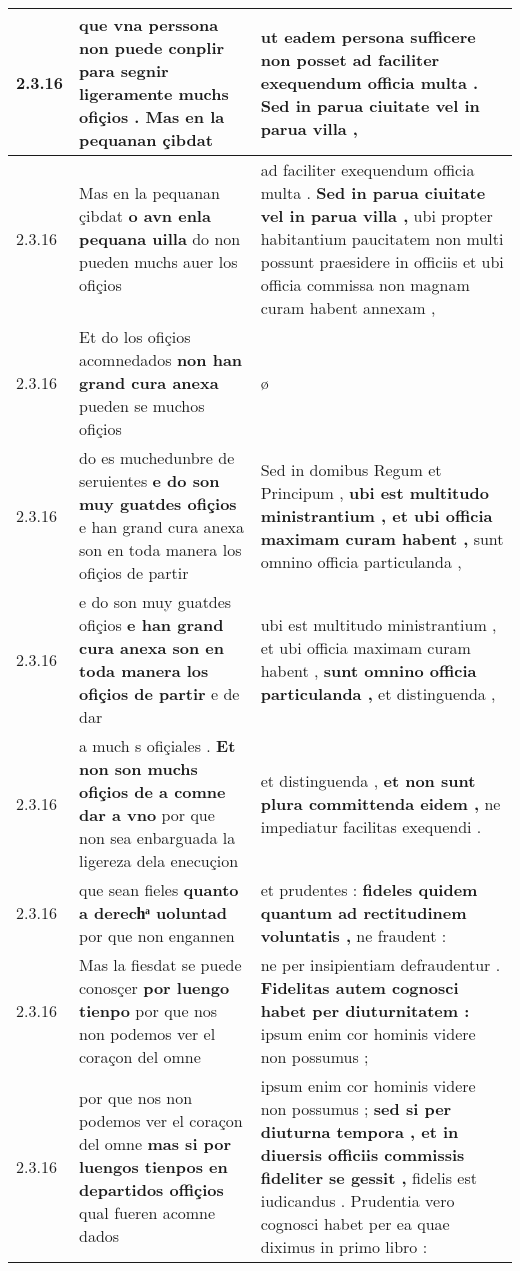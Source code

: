 \begin{tabular}{|p{1cm}|p{6.5cm}|p{6.5cm}|}
2.3.16 & que vna perssona non puede conplir \textbf{ para segnir ligeramente muchs ofiçios . } Mas en la pequanan çibdat & ut eadem persona sufficere non posset \textbf{ ad faciliter exequendum officia multa . } Sed in parua ciuitate vel in parua villa , \\\hline
2.3.16 & Mas en la pequanan çibdat \textbf{ o avn enla pequana uilla } do non pueden muchs auer los ofiçios & ad faciliter exequendum officia multa . \textbf{ Sed in parua ciuitate vel in parua villa , } ubi propter habitantium paucitatem non multi possunt praesidere in officiis et ubi officia commissa non magnam curam habent annexam , \\\hline
2.3.16 & Et do los ofiçios acomnedados \textbf{ non han grand cura anexa } pueden se muchos ofiçios & ø \\\hline
2.3.16 & do es muchedunbre de seruientes \textbf{ e do son muy guatdes ofiçios } e han grand cura anexa son en toda manera los ofiçios de partir & Sed in domibus Regum et Principum , \textbf{ ubi est multitudo ministrantium , et ubi officia maximam curam habent , } sunt omnino officia particulanda , \\\hline
2.3.16 & e do son muy guatdes ofiçios \textbf{ e han grand cura anexa son en toda manera los ofiçios de partir } e de dar & ubi est multitudo ministrantium , et ubi officia maximam curam habent , \textbf{ sunt omnino officia particulanda , } et distinguenda , \\\hline
2.3.16 & a much s ofiçiales . \textbf{ Et non son muchs ofiçios de a comne dar a vno } por que non sea enbarguada la ligereza dela enecuçion & et distinguenda , \textbf{ et non sunt plura committenda eidem , } ne impediatur facilitas exequendi . \\\hline
2.3.16 & que sean fieles \textbf{ quanto a derechͣ uoluntad } por que non engannen & et prudentes : \textbf{ fideles quidem quantum ad rectitudinem voluntatis , } ne fraudent : \\\hline
2.3.16 & Mas la fiesdat se puede conosçer \textbf{ por luengo tienpo } por que nos non podemos ver el coraçon del omne & ne per insipientiam defraudentur . \textbf{ Fidelitas autem cognosci habet per diuturnitatem : } ipsum enim cor hominis videre non possumus ; \\\hline
2.3.16 & por que nos non podemos ver el coraçon del omne \textbf{ mas si por luengos tienpos en departidos offiçios } qual fueren acomne dados & ipsum enim cor hominis videre non possumus ; \textbf{ sed si per diuturna tempora , et in diuersis officiis commissis fideliter se gessit , } fidelis est iudicandus . Prudentia vero cognosci habet per ea quae diximus in primo libro : \\\hline

\end{tabular}
